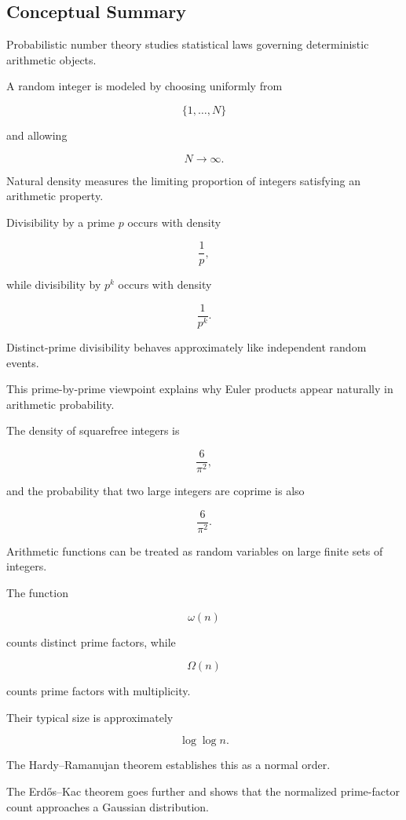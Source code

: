 \subsection{Conceptual Summary}
\label{subsec:probabilistic-number-theory-summary}

Probabilistic number theory studies statistical laws governing deterministic
arithmetic objects.

A random integer is modeled by choosing uniformly from

\[ \{1,\ldots,N\} \]

and allowing

\[ N\to\infty. \]

Natural density measures the limiting proportion of integers satisfying an
arithmetic property.

Divisibility by a prime \(p\) occurs with density

\[ \frac1p, \]

while divisibility by \(p^k\) occurs with density

\[ \frac1{p^k}. \]

Distinct-prime divisibility behaves approximately like independent random
events.

This prime-by-prime viewpoint explains why Euler products appear naturally
in arithmetic probability.

The density of squarefree integers is

\[ \boxed{\frac6{\pi^2}}, \]

and the probability that two large integers are coprime is also

\[ \boxed{\frac6{\pi^2}}. \]

Arithmetic functions can be treated as random variables on large finite
sets of integers.

The function

\[ \omega(n) \]

counts distinct prime factors, while

\[ \Omega(n) \]

counts prime factors with multiplicity.

Their typical size is approximately

\[ \log\log n. \]

The Hardy--Ramanujan theorem establishes this as a normal order.

The Erdős--Kac theorem goes further and shows that the normalized
prime-factor count approaches a Gaussian distribution.

